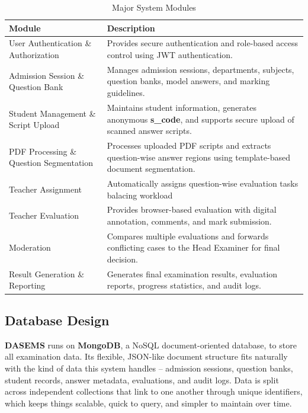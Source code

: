 \begin{table}[H]
\centering
\caption{Major System Modules}
\label{tab:system_modules}
\renewcommand{\arraystretch}{1.3}
\begin{tabular}{|p{5cm}|p{9cm}|}
\hline
\textbf{Module} & \textbf{Description} \\
\hline

User Authentication \& Authorization &
Provides secure authentication and role-based access control using JWT authentication. \\
\hline

Admission Session \& Question Bank &
Manages admission sessions, departments, subjects, question banks, model answers, and marking guidelines. \\
\hline

Student Management \& Script Upload &
Maintains student information, generates anonymous \textbf{s\_code}, and supports secure upload of scanned answer scripts. \\
\hline

PDF Processing \& Question Segmentation &
Processes uploaded PDF scripts and extracts question-wise answer regions using template-based document segmentation. \\
\hline

Teacher Assignment &
Automatically assigns question-wise evaluation tasks balacing workload \\
\hline

Teacher Evaluation &
Provides browser-based evaluation with digital annotation, comments, and mark submission. \\
\hline

Moderation &
Compares multiple evaluations and forwards conflicting cases to the Head Examiner for final decision. \\
\hline

Result Generation \& Reporting &
Generates final examination results, evaluation reports, progress statistics, and audit logs. \\
\hline

\end{tabular}
\end{table}

\subsection{Database Design}

\textbf{DASEMS} runs on \textbf{MongoDB}, a NoSQL document-oriented database, to store all examination data. Its flexible, JSON-like document structure fits naturally with the kind of data this system handles -- admission sessions, question banks, student records, answer metadata, evaluations, and audit logs. Data is split across independent collections that link to one another through unique identifiers, which keeps things scalable, quick to query, and simpler to maintain over time.

